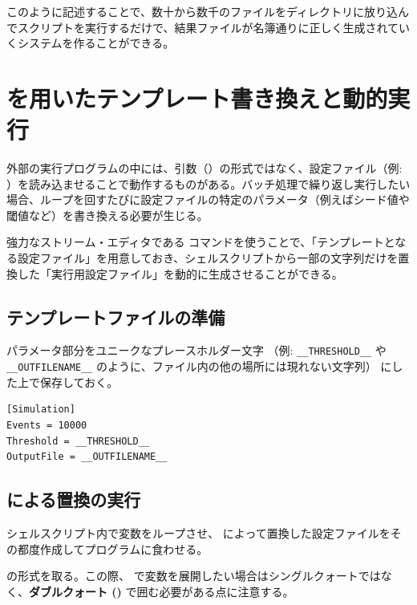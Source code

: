 このように記述することで、数十から数千のファイルをディレクトリに放り込んでスクリプトを実行するだけで、結果ファイルが名簿通りに正しく生成されていくシステムを作ることができる。

\section{ を用いたテンプレート書き換えと動的実行}

外部の実行プログラムの中には、引数（）の形式ではなく、設定ファイル（例: ）を読み込ませることで動作するものがある。バッチ処理で繰り返し実行したい場合、ループを回すたびに設定ファイルの特定のパラメータ（例えばシード値や閾値など）を書き換える必要が生じる。

強力なストリーム・エディタである  コマンドを使うことで、「テンプレートとなる設定ファイル」を用意しておき、シェルスクリプトから一部の文字列だけを置換した「実行用設定ファイル」を動的に生成させることができる。

\subsection{テンプレートファイルの準備}

パラメータ部分をユニークなプレースホルダー文字
（例: \verb|__THRESHOLD__| や \verb|__OUTFILENAME__| のように、ファイル内の他の場所には現れない文字列）
にした上で保存しておく。

\begin{lstlisting}[numbers=none, title={config\_template.ini}]
[Simulation]
Events = 10000
Threshold = __THRESHOLD__
OutputFile = __OUTFILENAME__
\end{lstlisting}

\subsection{ による置換の実行}

シェルスクリプト内で変数をループさせ、 によって置換した設定ファイルをその都度作成してプログラムに食わせる。

 の形式を取る。この際、 で変数を展開したい場合はシングルクォートではなく、\textbf{ダブルクォート ()} で囲む必要がある点に注意する。

